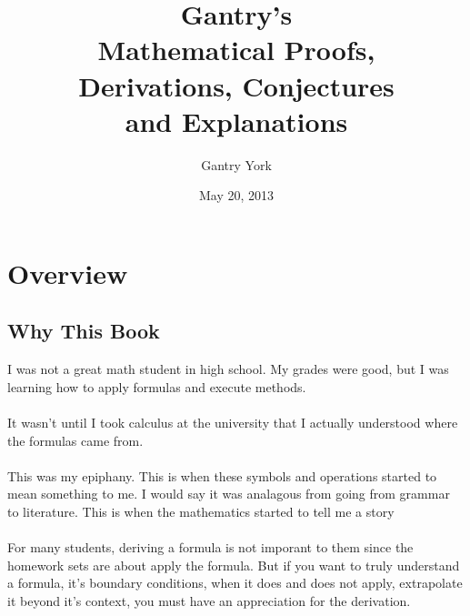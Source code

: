 \documentclass[11pt]{book}
\title{\textbf{Gantry's\\Mathematical Proofs,\\Derivations, Conjectures\\and Explanations}}
\author{Gantry York}
\date{May 20, 2013}
\begin{document}
\maketitle

\tableofcontents 


\chapter*{Overview}

\section*{Why This Book}
I was not a great math student in high school.  My grades were good, but I was learning how to apply formulas and execute methods.\\
\\
It wasn't until I took calculus at the university that I actually understood where the formulas came from.\\
\\
This was my epiphany.  This is when these symbols and operations started to mean something to me.  I would say it was analagous from going from grammar to literature.  This is when the mathematics started to tell me a story\\
\\
For many students, deriving a formula is not imporant to them since the homework sets are about apply the formula.  But if you want to truly understand a formula, it's boundary conditions, when it does and does not apply, extrapolate it beyond it's context, you must have an appreciation for the derivation.\\
\\
\end{document}
